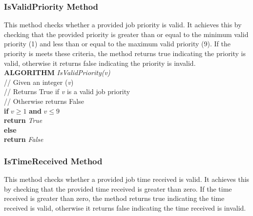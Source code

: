 \documentclass[12pt,a4paper]{article}
\begin{document}
			\newpage

			\subsubsection{IsValidPriority Method}
				This method checks whether a provided job priority is valid. It achieves this by 
				checking that the provided priority is greater than or equal to the minimum valid priority (1) and 
				less than or equal to the maximum valid priority (9). If the priority is meets these criteria, the 
				method returns true indicating the priority is valid, otherwise it returns false 
				indicating the priority is invalid.\\

				\textbf{ALGORITHM} \textit{IsValidPriority(v)}\\
				\null\hspace{1cm}// Given an integer (\textit{v})\\
				\null\hspace{1cm}// Returns True if \textit{v} is a valid job priority\\
				\null\hspace{1cm}// Otherwise returns False\\
				\null\hspace{1cm}\textbf{if} \textit{$v \geq 1$} \textbf{and} \textit{$v \leq 9$}\\
				\null\hspace{2cm}\textbf{return} \textit{True}\\
				\null\hspace{1cm}\textbf{else}\\
				\null\hspace{2cm}\textbf{return} \textit{False}\\
			
			\subsubsection{IsTimeReceived Method}
				This method checks whether a provided job time received is valid. It achieves this by
				checking that the provided time received is greater than zero. If the time received is
				greater than zero, the method returns true indicating the time received is valid, otherwise
				it returns false indicating the time received is invalid.\\
\end{document}
